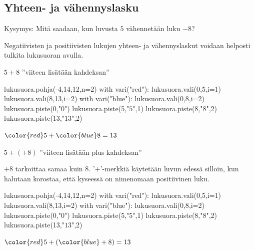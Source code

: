 
\subsection*{Yhteen- ja vähennyslasku}

    Kysymys: Mitä saadaan, kun luvusta $5$ vähennetään luku $-8$?
    
    Negatiivisten ja positiivisten lukujen yhteen- ja vähennyslaskut voidaan helposti tulkita lukusuoran avulla.
    
    
    $5+8$ ''viiteen lisätään kahdeksan''
\begin{center}
\begin{kuva}
	lukusuora.pohja(-4,14,12,n=2)
	with vari("red"):
		lukusuora.vali(0,5,i=1)
		lukusuora.vali(8,13,i=2)
	with vari("blue"): lukusuora.vali(0,8,i=2)
	lukusuora.piste(0,"$0$")
	lukusuora.piste(5,"$5$",1)
	lukusuora.piste(8,"$8$",2)
	lukusuora.piste(13,"$13$",2)
\end{kuva}
       ${\color{red}5}+{\color{blue}8}=13$
\end{center}
    
    $5+(+8)$ ''viiteen lisätään plus kahdeksan''
    
    $+8$ tarkoittaa samaa kuin $8$. '$+$'-merkkiä käytetään luvun edessä silloin, kun halutaan korostaa, että kyseessä on nimenomaan positiivinen luku.
    
    
\begin{center}
\begin{kuva}
	lukusuora.pohja(-4,14,12,n=2)
	with vari("red"):
		lukusuora.vali(0,5,i=1)
		lukusuora.vali(8,13,i=2)
	with vari("blue"): lukusuora.vali(0,8,i=2)
	lukusuora.piste(0,"$0$")
	lukusuora.piste(5,"$5$",1)
	lukusuora.piste(8,"$8$",2)
	lukusuora.piste(13,"$13$",2)
\end{kuva}
       ${\color{red}5}+({\color{blue}+8})=13$
\end{center}
    
